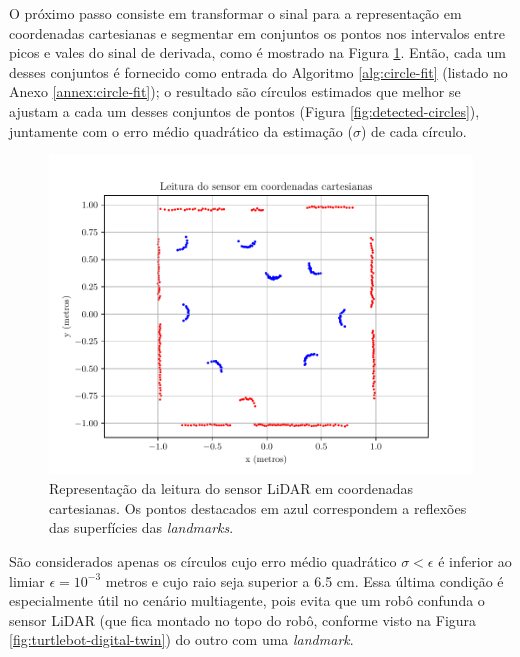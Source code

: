 O próximo passo consiste em transformar o sinal para a representação em 
coordenadas cartesianas e segmentar em conjuntos os pontos nos intervalos entre picos e vales do sinal de derivada, como é mostrado na Figura \ref{fig:sensor-data-cartesian}.
Então, cada um desses conjuntos é fornecido como entrada do Algoritmo 
\ref{alg:circle-fit} (listado no Anexo \ref{annex:circle-fit}); o resultado 
são círculos estimados que melhor se ajustam a cada um desses conjuntos de pontos (Figura \ref{fig:detected-circles}), juntamente com o 
erro médio quadrático da estimação ($\sigma$) de cada círculo.
\begin{figure}[]
  \centering
  \includegraphics[width=.8\textwidth]{figs/sensor_data_cartesian.pdf}
  \caption[Segmentação dos feixes refletidos pelas superfícies cilíndricas dos \textit{landmarks}]{Representação da leitura do sensor LiDAR em coordenadas 
  cartesianas. Os pontos destacados em azul correspondem a reflexões 
  das superfícies das \textit{landmarks}.}
  \label{fig:sensor-data-cartesian}
\end{figure}

São considerados apenas os círculos cujo erro médio quadrático $\sigma < \epsilon$ é inferior ao limiar $\epsilon = 10^{-3}$ metros e 
cujo raio seja superior a 6.5 cm. Essa última condição é especialmente útil no 
cenário multiagente, pois evita que um robô confunda o sensor LiDAR (que 
fica montado no topo do robô, conforme visto na Figura \ref{fig:turtlebot-digital-twin}) do outro com uma \textit{landmark}.

